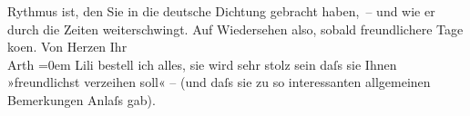 \begin{ledgroupsized}[t]{13cm}
                    Rythmus ist, den Sie in die deutsche Dichtung gebracht haben, – und wie er durch
                    die Zeiten weiterschwingt.\pend
           \pstart
           Auf Wiedersehen also, sobald freundlichere Tage ko{\geminationm}en.\pend
           \pstart
           Von Herzen Ihr{\\[\baselineskip]}\spacefill\mbox{Arth}\pend
           \leftskip=0em{}\pstart
           \noindent{}Lili bestell ich alles, sie wird sehr
                        stolz sein daſs sie Ihnen »freundlichst verzeihen soll« – (und daſs sie zu
                        so interessanten allgemeinen Bemerkungen Anlaſs gab).\pend
           \endnumbering{}\end{ledgroupsized}  \newcommand{\dateiname}{L02467}\newcommand{\titel}{Arthur Schnitzler an Hugo Hofmannsthal, 11. 3. 1926}\newcommand{\editorInnen}{Martin Anton Müller und Gerd-Hermann Susen}
      